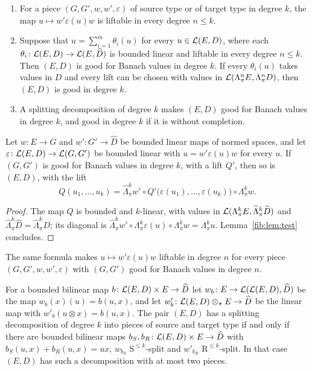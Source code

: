 \begin{theorem}[decompositions]\label{cmb:thm:decomposition}
\begin{enumerate}
\item For a piece $(G,G',w,w',\varepsilon)$ of source type or of target type in degree $k$, the map
$u\mapsto w'\varepsilon(u)w$ is liftable in every degree $n\le k$.
\item Suppose that $u=\sum_{i=1}^m\theta_i(u)$ for every $u\in\mathcal L(E,D)$, where each
$\theta_i\colon\mathcal L(E,D)\to\mathcal L(E,\widehat D)$ is bounded linear and liftable in every degree $n\le k$. Then $(E,D)$ is good
for Banach values in degree $k$. If every $\theta_i(u)$ takes values in $D$ and every lift can be chosen with values in
$\mathcal L(\Lambda^n_\pi E,\Lambda^n_\pi D)$, then $(E,D)$ is good in degree $k$.
\item A splitting decomposition of degree $k$ makes $(E,D)$ good for Banach values in degree $k$, and good in degree $k$
if it is without completion.
\end{enumerate}
\end{theorem}

\begin{proposition}[transfer]\label{cmb:prop:transfer}
Let $w\colon E\to G$ and $w'\colon G'\to\widehat D$ be bounded linear maps of normed spaces, and let
$\varepsilon\colon\mathcal L(E,D)\to\mathcal L(G,G')$ be bounded linear with $u=w'\varepsilon(u)w$ for every $u$. If $(G,G')$ is good for
Banach values in degree $k$, with a lift $Q'$, then so is $(E,D)$, with the lift
\[
 Q(u_1,\dots,u_k)=\widehat\Lambda^k_\pi w'\circ Q'\bigl(\varepsilon(u_1),\dots,\varepsilon(u_k)\bigr)\circ\Lambda^k_\pi w .
\]
\end{proposition}

\begin{proof}
The map $Q$ is bounded and $k$-linear, with values in $\mathcal L(\Lambda^k_\pi E,\widehat\Lambda^k_\pi\widehat D)$ and
$\widehat\Lambda^k_\pi\widehat D=\widehat\Lambda^k_\pi D$; its diagonal is
$\widehat\Lambda^k_\pi w'\circ\Lambda^k_\pi\varepsilon(u)\circ\Lambda^k_\pi w=\Lambda^k_\pi u$. Lemma~\ref{fib:lem:test}
concludes.
\end{proof}

The same formula makes $u\mapsto w'\varepsilon(u)w$ liftable in degree $n$ for every piece $(G,G',w,w',\varepsilon)$ with
$(G,G')$ good for Banach values in degree $n$.

\begin{proposition}\label{cmb:prop:normal-form}
For a bounded bilinear map $b\colon\mathcal L(E,D)\times E\to\widehat D$ let $w_b\colon E\to\mathcal L(\mathcal L(E,D),\widehat D)$ be the
map $w_b(x)(u)=b(u,x)$, and let $w'_b\colon\mathcal L(E,D)\otimes_\pi E\to\widehat D$ be the linear map with
$w'_b(u\otimes x)=b(u,x)$. The pair $(E,D)$ has a splitting decomposition of degree $k$ into pieces of source and target
type if and only if there are bounded bilinear maps $b_S,b_R\colon\mathcal L(E,D)\times E\to\widehat D$ with
$b_S(u,x)+b_R(u,x)=ux$, $w_{b_S}$ $\mathrm S^{\le k}$-split and $w'_{b_R}$ $\mathrm R^{\le k}$-split. In that case $(E,D)$
has such a decomposition with at most two pieces.
\end{proposition}

